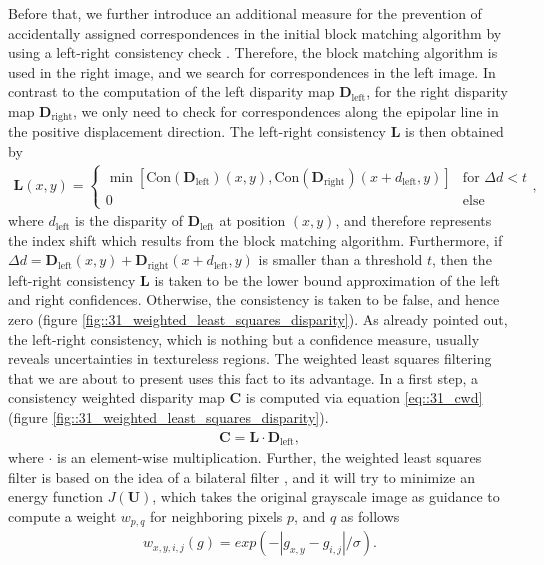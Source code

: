 Before that, we further introduce an additional measure for the prevention of accidentally assigned correspondences in the initial block matching algorithm by using a left-right consistency check \cite{egnal2004stereo}. Therefore, the block matching algorithm is used in the right image, and we search for correspondences in the left image. In contrast to the computation of the left disparity map $\bm{D}_\text{left}$, for the right disparity map $\bm{D}_\text{right}$, we only need to check for correspondences along the epipolar line in the positive displacement direction. The left-right consistency $\bm{L}$ is then obtained by 
\begin{align}
	\bm{L}(x, y) = 
	\begin{cases}
	\min \left[\text{Con}(\bm{D}_\text{left})(x, y), \text{Con}(\bm{D}_\text{right})(x + d_\text{left}, y)\right] & \text{for } \Delta d < t  \\
	0 & \text{else}
	\end{cases},
\end{align}
where $d_\text{left}$ is the disparity of $\bm{D}_\text{left}$ at position $(x,y)$, and therefore represents the index shift which results from the block matching algorithm. Furthermore, if $\Delta d = \bm{D}_\text{left}(x, y) + \bm{D}_\text{right}(x + d_\text{left}, y)$ is smaller than a threshold $t$, then the left-right consistency $\bm{L}$ is taken to be the lower bound approximation of the left and right confidences. Otherwise, the consistency is taken to be false, and hence zero (figure \ref{fig::31_weighted_least_squares_disparity}). As already pointed out, the left-right consistency, which is nothing but a confidence measure, usually reveals uncertainties in textureless regions. The weighted least squares filtering that we are about to present uses this fact to its advantage. In a first step, a consistency weighted disparity map $\bm{C}$ is computed via equation \ref{eq::31_cwd} (figure \ref{fig::31_weighted_least_squares_disparity}).
\begin{align}
	\bm{C}=\bm{L}\cdot\bm{D}_\text{left},
	\label{eq::31_cwd}
\end{align}
where $\cdot$ is an element-wise multiplication. Further, the weighted least squares filter is based on the idea of a bilateral filter \cite{tomasi1998bilateral}, and it will try to minimize an energy function $J(\bm{U})$, which takes the original grayscale image as guidance to compute a weight $w_{p,q}$ for neighboring pixels $p$, and $q$ as follows
\begin{align}
	w_{x,y,i,j}(g) = exp(-|g_{x,y}-g_{i,j}|/\sigma).
	\label{eq::31_weight}
\end{align}
